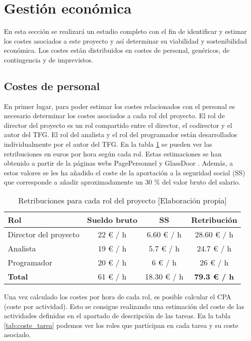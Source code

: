 \section{Gestión económica}
En esta sección se realizará un estudio completo con el fin de identificar y estimar los costes asociados a este proyecto y así determinar su viabilidad y sostenibilidad económica. Los costes están distribuidos en costes de personal, genéricos, de contingencia y de imprevistos.

\subsection{Costes de personal}
En primer lugar, para poder estimar los costes relacionados con el personal es necesario determinar los costes asociados a cada rol del proyecto. El rol de director del proyecto es un rol compartido entre el director, el codirector y el autor del TFG. El rol del analista y el rol del programador están desarrollados individualmente por el autor del TFG. En la tabla \ref{tab:remuneracion} se pueden ver las retribuciones en euros por hora según cada rol. Estas estimaciones se han obtenido a partir de la páginas webs PagePersonnel \cite{pagePersonel} y GlassDoor \cite{glassdoor}. Además, a estos valores se les ha añadido el coste de la aportación a la seguridad social (SS) que corresponde a añadir aproximadamente un 30 \% del valor bruto del salario.  

\begin{table}[h]
    \begin{center}
        \begin{tabular}{ l  c  c  c }
        \textbf{Rol} & \textbf{Sueldo bruto} & \textbf{SS} & \textbf{Retribución} \\ \hline
        Director del proyecto & 22 € / h & 6.60 € / h & 28.60 € / h \\ 
        Analista & 19 € / h & 5.7 € / h & 24.7 € / h \\
        Programador & 20 € / h & 6 € / h & 26 € / h \\
        \hline
         \textbf{Total} & 61 € / h & 18.30 € / h & \textbf{79.3 € / h}  \\
        \end{tabular}
        \caption{Retribuciones para cada rol del proyecto [Elaboración propia]}
        \label{tab:remuneracion}
    \end{center}
\end{table}
Una vez calculado los costes por hora de cada rol, es posible calcular el CPA (coste por actividad). Esto se consigue realizando una estimación del coste de las actividades definidas en el apartado de descripción de las tareas. En la tabla \ref{tab:coste_tarea} podemos ver los roles que participan en cada tarea y su coste asociado.

